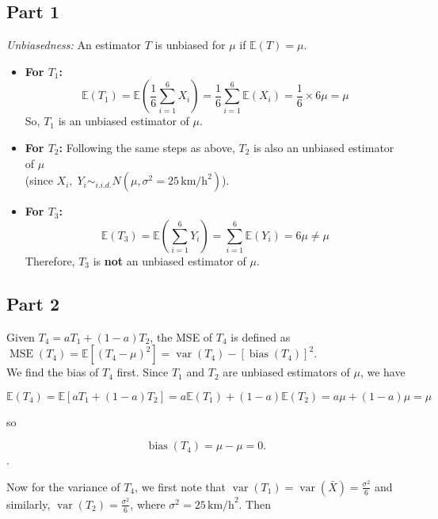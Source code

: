 \documentclass{article}
\begin{document}
\subsection*{Part 1}

\textit{Unbiasedness:} An estimator $T$ is unbiased for $\mu$ if $\mathbb{E}(T) = \mu$.

\begin{itemize}
    \item \textbf{For $T_1$:}
    $$
    \mathbb{E}(T_1) = \mathbb{E}\left(\frac{1}{6} \sum_{i=1}^{6} X_i\right) = \frac{1}{6} \sum_{i=1}^{6} \mathbb{E}(X_i) = \frac{1}{6} \times 6\mu = \mu
    $$
    So, $T_1$ is an unbiased estimator of $\mu$.

    \item \textbf{For $T_2$:}
    Following the same steps as above, $T_2$ is also an unbiased estimator of \( \mu \) \\
    (since $X_i, \; Y_i \sim_{i.i.d.} N(\mu, \sigma^2 = 25 \, \text{km/h}^2)$).

    \item \textbf{For $T_3$:}
    $$
    \mathbb{E}(T_3) = \mathbb{E}\left(\sum_{i=1}^{6} Y_i\right) = \sum_{i=1}^{6} \mathbb{E}(Y_i) = 6\mu \neq \mu
    $$
    Therefore, $T_3$ is \textbf{not} an unbiased estimator of $\mu$.
\end{itemize}

\subsection*{Part 2}

Given $T_4 = aT_1 + (1 - a)T_2$, the MSE of $T_4$ is defined as $ \operatorname{MSE}(T_4) = \mathbb{E}[(T_4 - \mu)^2] = \operatorname{var}(T_4) - [\operatorname{bias}(T_4)]^2$. \\

We find the bias of $T_4$ first. Since $T_1$ and $T_2$ are unbiased estimators of $\mu$, we have

$$
\mathbb{E}(T_4) = \mathbb{E}[aT_1 + (1-a)T_2] = a\mathbb{E}(T_1) + (1-a)\mathbb{E}(T_2) = a\mu + (1-a)\mu = \mu
$$

so

$$
\operatorname{bias}(T_4) = \mu - \mu = 0.
$$. 

Now for the variance of $T_4$, we first note that $\operatorname{var}(T_1) = \operatorname{var}(\bar{X}) = \frac{\sigma^2}{6}$ and similarly,  $\operatorname{var}(T_2) = \frac{\sigma^2}{6}$, where $\sigma^2 = 25 \, \text{km/h}^2$. Then
\end{document}
